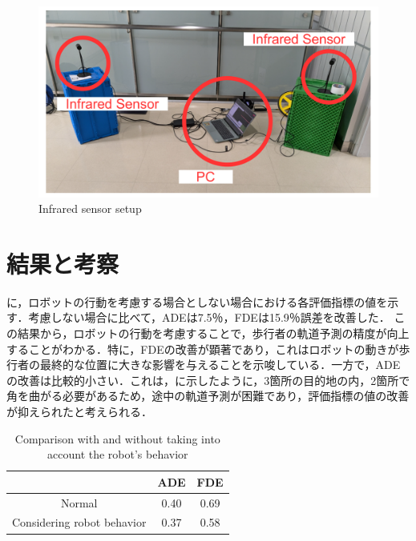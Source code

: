 \begin{figure}[H]
  \centering
 \includegraphics[keepaspectratio, scale=0.32]
      {images/tracking-sensor.pdf}
\caption{Infrared sensor setup}
 \label{Fig:oculus-sensor}
\end{figure}

\section{結果と考察}\label{sec:oculus-exp-result}
に，ロボットの行動を考慮する場合としない場合における各評価指標の値を示す．考慮しない場合に比べて，ADEは7.5％，FDEは15.9％誤差を改善した．
この結果から，ロボットの行動を考慮することで，歩行者の軌道予測の精度が向上することがわかる．特に，FDEの改善が顕著であり，これはロボットの動きが歩行者の最終的な位置に大きな影響を与えることを示唆している．一方で，ADEの改善は比較的小さい．これは，に示したように，3箇所の目的地の内，2箇所で角を曲がる必要があるため，途中の軌道予測が困難であり，評価指標の値の改善が抑えられたと考えられる．

\begin{table}[H]
  \begin{center}
  \caption{Comparison with and without taking into account the robot's behavior}
  \label{tab:robot-behavior}
  \begin{tabular}{c||c|c}
   & ADE & FDE \\ 
  \hline \hline
  Normal      & 0.40       & 0.69                      \\
  \hline
  Considering robot behavior    & 0.37       & 0.58                      \\
  \hline
  \end{tabular}
  \end{center}
\end{table}

